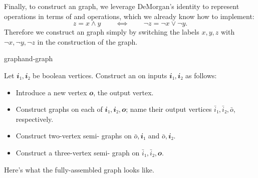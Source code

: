 Finally, to construct an \AND{} graph, we leverage DeMorgan's identity to
represent \AND{} operations in terms of \NOT{} and \OR{} operations, which we
already know how to implement:
\[
  z=x∧y \qquad⟺\qquad ¬z=¬x∨¬y.
\]
Therefore we construct an \AND{} graph simply by switching the labels \(x,y,z\)
with \(¬x,¬y,¬z\) in the construction of the \OR{} graph.

\begin{definition}{\AND{} graph}{and-graph}

  Let \(𝒊₁,𝒊₂\) be boolean vertices.  Construct an  on inputs
  \(𝒊₁,𝒊₂\) as follows:
  \begin{itemize}[nosep]
    \item Introduce a new vertex \(𝒐\), the output vertex.
    \item Construct \NOT{} graphs on each of \(𝒊₁,𝒊₂,𝒐\); name their output
      vertices \(\bar i₁,\bar i₂,\bar o\), respectively.
    \item Construct two-vertex semi-\OR{} graphs on \(\bar o,𝒊₁\) and \(\bar
      o,𝒊₂\).
    \item Construct a three-vertex semi-\OR{} graph on \(\bar i₁,\bar i₂,𝒐\).
  \end{itemize}

  \begin{center}
  \end{center}

  \begin{aside}
    Here's what the fully-assembled \AND{} graph looks like.
    \begin{center}
    \end{center}
  \end{aside}

\end{definition}

